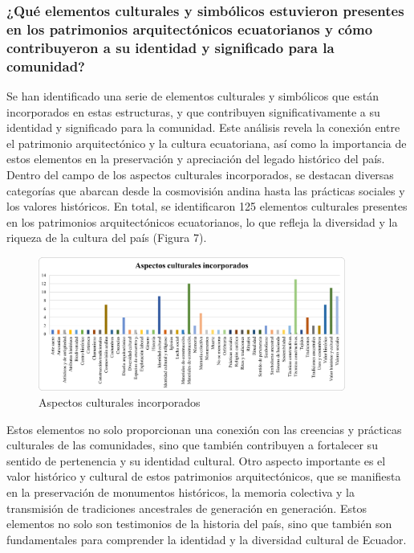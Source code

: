\documentclass[journal,article,submit,pdftex,moreauthors]{Definitions/mdpi}
\begin{document}
\subsubsection{\textbf{¿Qué elementos culturales y simbólicos estuvieron presentes en los patrimonios arquitectónicos ecuatorianos y cómo contribuyeron a su identidad y significado para la comunidad?}}\par %
Se han identificado una serie de elementos culturales y simbólicos que están incorporados en estas estructuras, y que contribuyen significativamente a su identidad y significado para la comunidad. Este análisis revela la conexión entre el patrimonio arquitectónico y la cultura ecuatoriana, así como la importancia de estos elementos en la preservación y apreciación del legado histórico del país. Dentro del campo de los aspectos culturales incorporados, se destacan diversas categorías que abarcan desde la cosmovisión andina hasta las prácticas sociales y los valores históricos. En total, se identificaron 125 elementos culturales presentes en los patrimonios arquitectónicos ecuatorianos, lo que refleja la diversidad y la riqueza de la cultura del país (Figura 7). 
 \par %
  \begin{figure} [h!]
    \centering
    \includegraphics[width=0.9\textwidth]{Graficos/Aspectos culturales incorporados.png }
    \caption{Aspectos culturales incorporados}
    \label{fig:grafico}
\end{figure}
\par %
Estos elementos no solo proporcionan una conexión con las creencias y prácticas culturales de las comunidades, sino que también contribuyen a fortalecer su sentido de pertenencia y su identidad cultural. Otro aspecto importante es el valor histórico y cultural de estos patrimonios arquitectónicos, que se manifiesta en la preservación de monumentos históricos, la memoria colectiva y la transmisión de tradiciones ancestrales de generación en generación. Estos elementos no solo son testimonios de la historia del país, sino que también son fundamentales para comprender la identidad y la diversidad cultural de Ecuador.
 \par %
\end{document}
